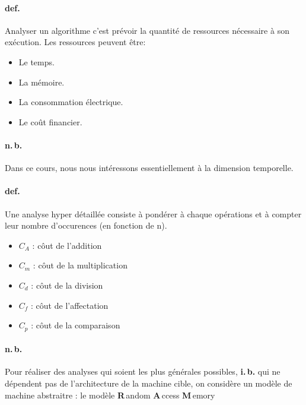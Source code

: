 \documentclass{report}
\begin{document}
    \paragraph{def.} Analyser un algorithme c'est prévoir la quantité de ressources nécessaire à son exécution. Les ressources peuvent être:
    \begin{itemize}
      \item Le temps.
      \item La mémoire.
      \item La consommation électrique.
      \item Le coût financier.
    \end{itemize}

    \paragraph{n.\,b.} Dans ce cours, nous nous intéressons essentiellement à la dimension temporelle.


    \paragraph{def.} Une analyse hyper détaillée consiste à pondérer à chaque opérations et à compter leur nombre d'occurences (en fonction de n).
    \begin{itemize}
      \item $C_{A}$ : côut de l'addition
      \item $C_{m}$ : côut de la multiplication
      \item $C_{d}$ : côut de la division
      \item $C_{f}$ : côut de l'affectation
      \item $C_{p}$ : côut de la comparaison
    \end{itemize}


    \paragraph{n.\,b.} Pour réaliser des analyses qui soient les plus générales possibles, \textbf{i.\,b.} qui ne dépendent pas de l'architecture de la machine cible, on considère un modèle de machine abstraitre : le modèle \textbf{R}\,andom \textbf{A}\,ccess \textbf{M}\,emory
\end{document}

